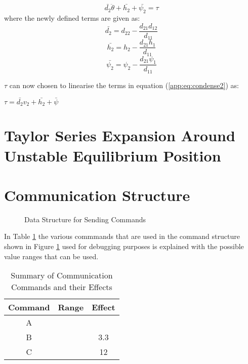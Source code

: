 \begin{equation} \label{app:eq:condense2}
\bar{d_{2}}\ddot{\theta} + \bar{h_{2}} + \bar{\psi_{2}} = \tau
\end{equation}
where the newly defined terms are given as: 
$$\bar{d_{2}} = d_{22} - \frac{d_{21}d_{12}}{d_{11}}$$
$$\bar{h_{2}} = h_{2} - \frac{d_{21}h_{1}}{d_{11}} $$
$$\bar{\psi_{2}} = \psi_{2} - \frac{d_{21}\psi_{1}}{d_{11}} $$


$\tau$ can now chosen to linearise the terms in equation (\ref{app:eq:condense2}) as:

$\tau = \bar{d_{2}}v_{2}+\bar{h_{2}} + \bar{\psi}$


\section{Taylor Series Expansion Around Unstable Equilibrium Position}
\label{sec:linerisation}



\section{Communication Structure}
\label{sec:software_requirements}
\begin{figure}[h]
	\centering
	
	\caption{Data Structure for Sending Commands}
	\label{fig:uart_struct_app}
\end{figure}

In Table \ref{table:uart_commands} the various commmands that are used in the command structure shown in Figure \ref{fig:uart_struct_app} used for debugging purposes is explained with the possible value ranges that can be used.


\begin{table}[h]
	\centering
	\begin{tabular}{|c|c|c|}
		\hline
		Command & Range & Effect \\
		\hline
		\hline
		A & & \\
		\hline
		B & &\SI{3.3}{} \\
		\hline
		C & &\SI{12}{} \\
		\hline
	\end{tabular}
	\caption{Summary of Communication Commands and their Effects}
	\label{table:uart_commands}
\end{table}


\newpage


%


\endinput
